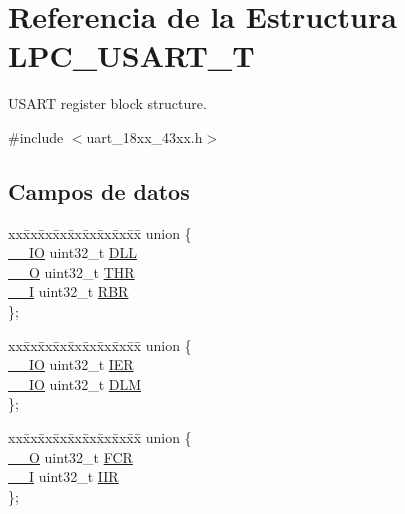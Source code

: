 \hypertarget{struct_l_p_c___u_s_a_r_t___t}{}\section{Referencia de la Estructura L\+P\+C\+\_\+\+U\+S\+A\+R\+T\+\_\+T}
\label{struct_l_p_c___u_s_a_r_t___t}


U\+S\+A\+RT register block structure.  




{\ttfamily \#include $<$uart\+\_\+18xx\+\_\+43xx.\+h$>$}

\subsection*{Campos de datos}
\begin{DoxyCompactItemize}
\item 
\begin{tabbing}
xx\=xx\=xx\=xx\=xx\=xx\=xx\=xx\=xx\=\kill
union \{\\
\>\hyperlink{core__sc300_8h_aec43007d9998a0a0e01faede4133d6be}{\_\_IO} uint32\_t \hyperlink{struct_l_p_c___u_s_a_r_t___t_ae2249b8b2ab54c7bd62ee83cd78f9bca}{DLL}\\
\>\hyperlink{core__sc300_8h_a7e25d9380f9ef903923964322e71f2f6}{\_\_O} uint32\_t \hyperlink{struct_l_p_c___u_s_a_r_t___t_a2f676c9b260c56f817a731fa0d5bd038}{THR}\\
\>\hyperlink{core__sc300_8h_af63697ed9952cc71e1225efe205f6cd3}{\_\_I} uint32\_t \hyperlink{struct_l_p_c___u_s_a_r_t___t_a3e6148ef7c298a3bf4982bb640b55470}{RBR}\\
\}; \\

\end{tabbing}\item 
\begin{tabbing}
xx\=xx\=xx\=xx\=xx\=xx\=xx\=xx\=xx\=\kill
union \{\\
\>\hyperlink{core__sc300_8h_aec43007d9998a0a0e01faede4133d6be}{\_\_IO} uint32\_t \hyperlink{struct_l_p_c___u_s_a_r_t___t_a6566f8cfbd1d8aa7e8db046aa35e77db}{IER}\\
\>\hyperlink{core__sc300_8h_aec43007d9998a0a0e01faede4133d6be}{\_\_IO} uint32\_t \hyperlink{struct_l_p_c___u_s_a_r_t___t_abee9a1f3f48fd193f59f8a85a11d0462}{DLM}\\
\}; \\

\end{tabbing}\item 
\begin{tabbing}
xx\=xx\=xx\=xx\=xx\=xx\=xx\=xx\=xx\=\kill
union \{\\
\>\hyperlink{core__sc300_8h_a7e25d9380f9ef903923964322e71f2f6}{\_\_O} uint32\_t \hyperlink{struct_l_p_c___u_s_a_r_t___t_a29e4c904f59eeaca0d80186f3b36dedf}{FCR}\\
\>\hyperlink{core__sc300_8h_af63697ed9952cc71e1225efe205f6cd3}{\_\_I} uint32\_t \hyperlink{struct_l_p_c___u_s_a_r_t___t_a2cab358d182aaf444bd1e2e6fa824d15}{IIR}\\
\}; \\


\end{tabbing}
\end{DoxyCompactItemize}
